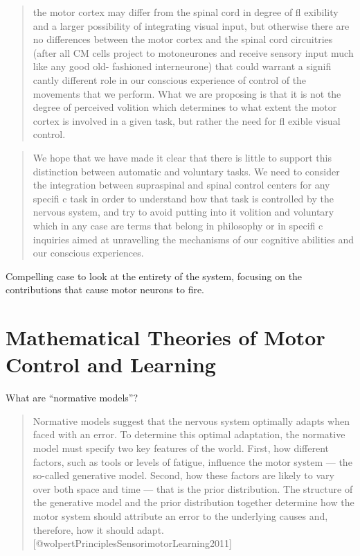 \documentclass[../main.tex]{subfiles}
\begin{document}
{{{\begin{quote} 
  the motor cortex may differ from the spinal cord in degree of fl exibility and a larger possibility of integrating visual input, but otherwise there are no differences between the motor cortex and the spinal cord circuitries (after all CM cells project to motoneurones and receive sensory input much like any good old- fashioned interneurone) that could warrant a signifi cantly different role in our conscious experience of control of the movements that we perform. What we are proposing is that it is not the degree of perceived volition which determines to what extent the motor cortex is involved in a given task, but rather the need for fl exible visual control.
\end{quote}

\begin{quote} 
  We hope that we have made it clear that there is little to support this distinction between automatic and voluntary tasks. We need to consider the integration between supraspinal and spinal control centers for any specifi c task in order to understand how that task is controlled by the nervous system, and try to avoid putting into it volition and voluntary which in any case are terms that belong in philosophy or in specifi c inquiries aimed at unravelling the mechanisms of our cognitive abilities and our conscious experiences.
\end{quote}

Compelling case to look at the entirety of the system, focusing on the contributions that cause motor neurons to fire.


\section{Mathematical Theories of Motor Control and Learning}
  
  What are ``normative models''?
  
  \begin{quote}
  Normative models suggest that the nervous system optimally adapts when
  faced with an error. To determine this optimal adaptation, the normative
  model must specify two key features of the world. First, how different
  factors, such as tools or levels of fatigue, influence the motor system
  --- the so-called generative model. Second, how these factors are likely
  to vary over both space and time --- that is the prior distribution. The
  structure of the generative model and the prior distribution together
  determine how the motor system should attribute an error to the
  underlying causes and, therefore, how it should adapt.
  {[}@wolpertPrinciplesSensorimotorLearning2011{]}
  \end{quote}
  
}}}
\end{document}
